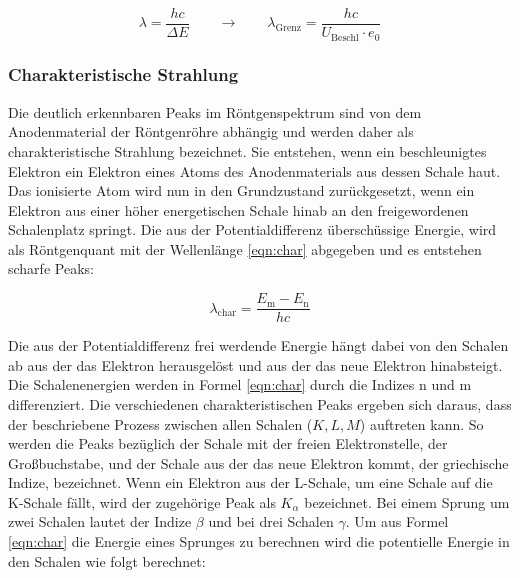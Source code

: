 \documentclass[titlepage = firstcover]{scrartcl}
\begin{document}
                \begin{equation*}
                    \lambda = \frac{hc}{\Delta E} \qquad \longrightarrow \qquad \lambda_{\text{Grenz}} = \frac{hc}{U_{\text{Beschl}}\cdot e_0}
                \end{equation*}
                \noindent
            
            \newpage
            \subsubsection{Charakteristische Strahlung}
                Die deutlich erkennbaren Peaks im Röntgenspektrum sind von dem Anodenmaterial der Röntgenröhre abhängig und werden daher als charakteristische Strahlung bezeichnet. Sie entstehen, wenn
                ein beschleunigtes Elektron ein Elektron eines Atoms des Anodenmaterials aus dessen Schale haut. Das ionisierte Atom wird nun in den Grundzustand zurückgesetzt, wenn ein Elektron 
                aus einer höher energetischen Schale hinab an den freigewordenen Schalenplatz springt. Die aus der Potentialdifferenz überschüssige Energie, wird als Röntgenquant mit der
                Wellenlänge \ref{eqn:char} abgegeben und es entstehen scharfe Peaks:
                
                \begin{equation}
                    \lambda_{\text{char}} = \frac{E_{\text{m}}-E_{\text{n}}}{hc}
                    \label{eqn:char}
                \end{equation}
                
                \noindent
                Die aus der Potentialdifferenz frei werdende Energie hängt dabei von den Schalen ab aus der das Elektron herausgelöst und aus der das neue Elektron hinabsteigt. Die Schalenenergien 
                werden in Formel \ref{eqn:char} durch die Indizes n und m differenziert. Die verschiedenen charakteristischen Peaks ergeben sich daraus, dass der beschriebene Prozess zwischen
                allen Schalen ($K, L, M$) auftreten kann. So werden die Peaks bezüglich der Schale mit der freien Elektronstelle, der Großbuchstabe, und der Schale aus der das neue Elektron kommt,
                der griechische Indize, bezeichnet. Wenn ein Elektron aus der L-Schale, um eine Schale auf die K-Schale fällt, wird der zugehörige Peak als $K_{\alpha}$ bezeichnet. Bei einem Sprung
                um zwei Schalen lautet der Indize $\beta$ und bei drei Schalen $\gamma$. Um aus Formel \ref{eqn:char} die Energie eines Sprunges zu berechnen wird die potentielle Energie in den
                Schalen wie folgt berechnet:
\end{document}
